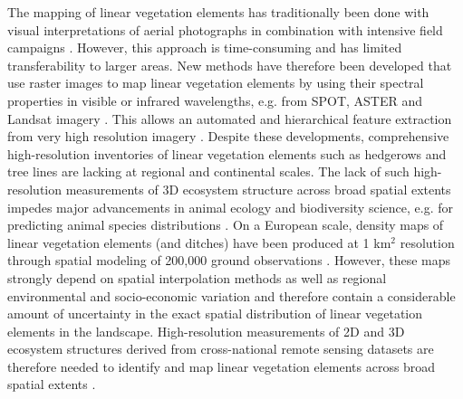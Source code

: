 The mapping of linear vegetation elements has traditionally been done with visual interpretations of aerial photographs in combination with intensive field campaigns \citep{aksoy2010automatic}. However, this approach is time-consuming and has limited transferability to larger areas. New methods have therefore been developed that use raster images to map linear vegetation elements by using their spectral properties in visible or infrared wavelengths, e.g. from SPOT, ASTER and Landsat imagery \citep{thornton2006sub, vannier2014multiscale,tansey2009object}. This allows an automated and hierarchical feature extraction from very high resolution imagery \citep{aksoy2010automatic}. Despite these developments, comprehensive high-resolution inventories of linear vegetation elements such as hedgerows and tree lines are lacking at regional and continental scales. The lack of such high-resolution measurements of 3D ecosystem structure across broad spatial extents impedes major advancements in animal ecology and biodiversity science, e.g. for predicting animal species distributions \citep{kissling2017eecolidar}. On a European scale, density maps of linear vegetation elements (and ditches) have been produced at 1 km$^2$ resolution through spatial modeling of 200,000 ground observations \citep{van2013modelling}. However, these maps strongly depend on spatial interpolation methods as well as regional environmental and socio-economic variation and therefore contain a considerable amount of uncertainty in the exact spatial distribution of linear vegetation elements in the landscape. High-resolution measurements of 2D and 3D ecosystem structures derived from cross-national remote sensing datasets are therefore needed to identify and map linear vegetation elements across broad spatial extents \citep{kissling2017eecolidar}.

